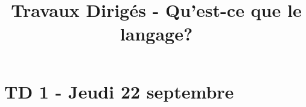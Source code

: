 \documentclass[a4paper,12pt]{article}
\begin{document}
\title{Travaux Dirigés - Qu'est-ce que le langage?}
\maketitle
\tableofcontents
\section{TD 1 - Jeudi 22 septembre}

\end{document}
